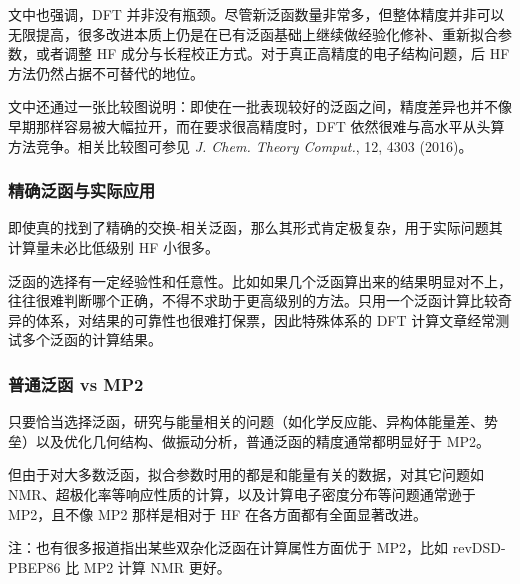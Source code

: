文中也强调，DFT 并非没有瓶颈。尽管新泛函数量非常多，但整体精度并非可以无限提高，很多改进本质上仍是在已有泛函基础上继续做经验化修补、重新拟合参数，或者调整 HF 成分与长程校正方式。对于真正高精度的电子结构问题，后 HF 方法仍然占据不可替代的地位。

文中还通过一张比较图说明：即使在一批表现较好的泛函之间，精度差异也并不像早期那样容易被大幅拉开，而在要求很高精度时，DFT 依然很难与高水平从头算方法竞争。相关比较图可参见 \textit{J. Chem. Theory Comput.}, 12, 4303 (2016)。

\subsubsection*{精确泛函与实际应用}

即使真的找到了精确的交换-相关泛函，那么其形式肯定极复杂，用于实际问题其计算量未必比低级别 HF 小很多。

泛函的选择有一定经验性和任意性。比如如果几个泛函算出来的结果明显对不上，往往很难判断哪个正确，不得不求助于更高级别的方法。只用一个泛函计算比较奇异的体系，对结果的可靠性也很难打保票，因此特殊体系的 DFT 计算文章经常测试多个泛函的计算结果。

\subsubsection*{普通泛函 vs MP2}

只要恰当选择泛函，研究与能量相关的问题（如化学反应能、异构体能量差、势垒）以及优化几何结构、做振动分析，普通泛函的精度通常都明显好于 MP2。

但由于对大多数泛函，拟合参数时用的都是和能量有关的数据，对其它问题如 NMR、超极化率等响应性质的计算，以及计算电子密度分布等问题通常逊于 MP2，且不像 MP2 那样是相对于 HF 在各方面都有全面显著改进。

注：也有很多报道指出某些双杂化泛函在计算属性方面优于 MP2，比如 revDSD-PBEP86 比 MP2 计算 NMR 更好。

\begin{center}
\end{center}

